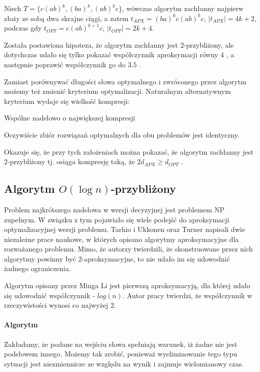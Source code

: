 Niech $T = \{c(ab)^k, (ba)^k, (ab)^kc\}$, wówczas algorytm zachłanny najpierw złoży ze sobą dwa skrajne ciągi, a zatem $t_{APX} = (ba)^kc(ab)^kc$, $|t_{APX}| = 4 k + 2$, podczas gdy $t_{OPT} = c(ab)^{k + 1}c$, $|t_{OPT}| = 2 k + 4$.

Została postawiona hipoteza, że algorytm zachłanny jest $2$-przybliżony, ale dotychczas udało się tylko pokazać współczynnik aproksymacji równy $4$ \citep{blum1994linear}, a następnie poprawić współczynnik go do $3.5$ \citep{kaplan2005approximation}.

Zamiast porównywać długości słowa optymalnego i zwróconego przez algorytm możemy też zmienić kryterium optymalizacji.
Naturalnym alternatywnym kryterium wydaje się wielkość kompresji:

\begin{algorithm}[H]
    \caption{Wspólne nadsłowo o największej kompresji}
\end{algorithm}
Oczywiście zbiór rozwiązań optymalnych dla obu problemów jest identyczny.

Okazuje się, że przy tych założeniach można pokazać, że algorytm zachłanny jest $2$-przybliżony tj. osiąga kompresję taką, że $2 d_{APX} \ge d_{OPT}$ \citep{tarhio1988greedy}.

\subsection{Algorytm $O(\log{n})$-przybliżony}
Problem najkrótszego nadsłowa w wersji decyzyjnej jest problemem NP zupełnym. W związku z tym pojawiało się wiele podejść do aproksymacji optymalizacyjnej wersji problemu. Tarhio i Ukkonen oraz Turner napisali dwie niezależne prace naukowe, w których opisano algorytmy aproksymacyjne dla rozważanego problemu. Mimo, że autorzy twierdzili, że skonstruowane przez nich algorytmy powinny być $2$-aproksymacyjne, to nie udało im się udowodnić żadnego ograniczenia. 

Algorytm opisany przez Minga Li jest pierwszą aproksymacyją, dla której udało się udowodnić współczynnik - $log(n)$. Autor pracy twierdzi, że współczynnik w rzeczywistości wynosi co najwyżej $2$.
  
\paragraph{Algorytm}
Zakładamy, że podane na wejściu słowa spełniają warunek, iż żadne nie jest podsłowem innego. Możemy tak zrobić, ponieważ wyeliminowanie tego typu sytuacji jest niezmiennicze ze względu na wynik i zajmuje wielomianowy czas.
\newline 

